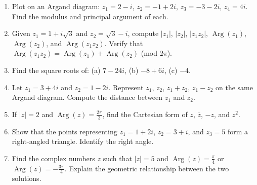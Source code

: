 \documentclass[11pt]{article}
\begin{document}
\begin{exercice}
\begin{enumerate}
    \item Plot on an Argand diagram: $z_1 = 2-i$, $z_2 = -1+2i$, $z_3 = -3-2i$, $z_4 = 4i$.  Find the modulus and principal argument of each.
    \item Given $z_1 = 1+i\sqrt{3}$ and $z_2 = \sqrt{3}-i$, compute $|z_1|$, $|z_2|$, $|z_1z_2|$, $\operatorname{Arg}(z_1)$, $\operatorname{Arg}(z_2)$, and $\operatorname{Arg}(z_1z_2)$.  Verify that $\operatorname{Arg}(z_1z_2) = \operatorname{Arg}(z_1)+\operatorname{Arg}(z_2)$ (mod $2\pi$).
    \item Find the square roots of: (a) $7-24i$, (b) $-8+6i$, (c) $-4$.
    \item Let $z_1 = 3+4i$ and $z_2 = 1-2i$.  Represent $z_1$, $z_2$, $z_1+z_2$, $z_1-z_2$ on the same Argand diagram.  Compute the distance between $z_1$ and $z_2$.
    \item If $|z| = 2$ and $\operatorname{Arg}(z) = \frac{2\pi}{3}$, find the Cartesian form of $z$, $\overline{z}$, $-z$, and $z^2$.
    \item Show that the points representing $z_1 = 1+2i$, $z_2 = 3+i$, and $z_3 = 5$ form a right-angled triangle.  Identify the right angle.
    \item Find the complex numbers $z$ such that $|z| = 5$ and $\operatorname{Arg}(z) = \frac{\pi}{4}$ or $\operatorname{Arg}(z) = -\frac{3\pi}{4}$.  Explain the geometric relationship between the two solutions.
\end{enumerate}
\end{exercice}
\end{document}
